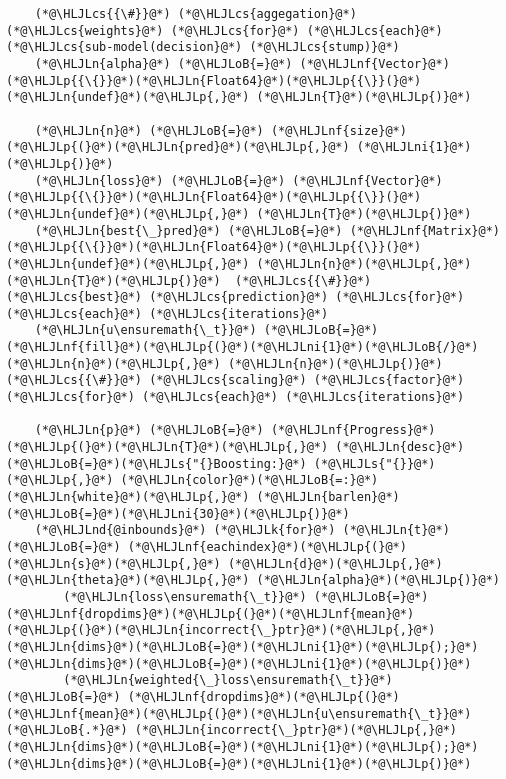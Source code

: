 \documentclass[12pt,a4paper]{article}
\newcommand{\HLJLk}[1]{\textcolor[RGB]{148,91,176}{\textbf{#1}}}
\newcommand{\HLJLn}[1]{#1}
\newcommand{\HLJLnd}[1]{\textcolor[RGB]{214,102,97}{#1}}
\newcommand{\HLJLnf}[1]{\textcolor[RGB]{66,102,213}{#1}}
\newcommand{\HLJLs}[1]{\textcolor[RGB]{201,61,57}{#1}}
\newcommand{\HLJLni}[1]{\textcolor[RGB]{59,151,46}{#1}}
\newcommand{\HLJLoB}[1]{\textcolor[RGB]{102,102,102}{\textbf{#1}}}
\newcommand{\HLJLp}[1]{#1}
\newcommand{\HLJLcs}[1]{\textcolor[RGB]{153,153,119}{\textit{#1}}}
\begin{document}
\begin{lstlisting}
    (*@\HLJLcs{{\#}}@*) (*@\HLJLcs{aggegation}@*) (*@\HLJLcs{weights}@*) (*@\HLJLcs{for}@*) (*@\HLJLcs{each}@*) (*@\HLJLcs{sub-model(decision}@*) (*@\HLJLcs{stump)}@*)
    (*@\HLJLn{alpha}@*) (*@\HLJLoB{=}@*) (*@\HLJLnf{Vector}@*)(*@\HLJLp{{\{}}@*)(*@\HLJLn{Float64}@*)(*@\HLJLp{{\}}(}@*)(*@\HLJLn{undef}@*)(*@\HLJLp{,}@*) (*@\HLJLn{T}@*)(*@\HLJLp{)}@*)

    (*@\HLJLn{n}@*) (*@\HLJLoB{=}@*) (*@\HLJLnf{size}@*)(*@\HLJLp{(}@*)(*@\HLJLn{pred}@*)(*@\HLJLp{,}@*) (*@\HLJLni{1}@*)(*@\HLJLp{)}@*)
    (*@\HLJLn{loss}@*) (*@\HLJLoB{=}@*) (*@\HLJLnf{Vector}@*)(*@\HLJLp{{\{}}@*)(*@\HLJLn{Float64}@*)(*@\HLJLp{{\}}(}@*)(*@\HLJLn{undef}@*)(*@\HLJLp{,}@*) (*@\HLJLn{T}@*)(*@\HLJLp{)}@*)
    (*@\HLJLn{best{\_}pred}@*) (*@\HLJLoB{=}@*) (*@\HLJLnf{Matrix}@*)(*@\HLJLp{{\{}}@*)(*@\HLJLn{Float64}@*)(*@\HLJLp{{\}}(}@*)(*@\HLJLn{undef}@*)(*@\HLJLp{,}@*) (*@\HLJLn{n}@*)(*@\HLJLp{,}@*) (*@\HLJLn{T}@*)(*@\HLJLp{)}@*)  (*@\HLJLcs{{\#}}@*) (*@\HLJLcs{best}@*) (*@\HLJLcs{prediction}@*) (*@\HLJLcs{for}@*) (*@\HLJLcs{each}@*) (*@\HLJLcs{iterations}@*)
    (*@\HLJLn{u\ensuremath{\_t}}@*) (*@\HLJLoB{=}@*) (*@\HLJLnf{fill}@*)(*@\HLJLp{(}@*)(*@\HLJLni{1}@*)(*@\HLJLoB{/}@*)(*@\HLJLn{n}@*)(*@\HLJLp{,}@*) (*@\HLJLn{n}@*)(*@\HLJLp{)}@*)  (*@\HLJLcs{{\#}}@*) (*@\HLJLcs{scaling}@*) (*@\HLJLcs{factor}@*) (*@\HLJLcs{for}@*) (*@\HLJLcs{each}@*) (*@\HLJLcs{iterations}@*)

    (*@\HLJLn{p}@*) (*@\HLJLoB{=}@*) (*@\HLJLnf{Progress}@*)(*@\HLJLp{(}@*)(*@\HLJLn{T}@*)(*@\HLJLp{,}@*) (*@\HLJLn{desc}@*)(*@\HLJLoB{=}@*)(*@\HLJLs{"{}Boosting:}@*) (*@\HLJLs{"{}}@*)(*@\HLJLp{,}@*) (*@\HLJLn{color}@*)(*@\HLJLoB{=:}@*)(*@\HLJLn{white}@*)(*@\HLJLp{,}@*) (*@\HLJLn{barlen}@*)(*@\HLJLoB{=}@*)(*@\HLJLni{30}@*)(*@\HLJLp{)}@*)
    (*@\HLJLnd{@inbounds}@*) (*@\HLJLk{for}@*) (*@\HLJLn{t}@*) (*@\HLJLoB{=}@*) (*@\HLJLnf{eachindex}@*)(*@\HLJLp{(}@*)(*@\HLJLn{s}@*)(*@\HLJLp{,}@*) (*@\HLJLn{d}@*)(*@\HLJLp{,}@*) (*@\HLJLn{theta}@*)(*@\HLJLp{,}@*) (*@\HLJLn{alpha}@*)(*@\HLJLp{)}@*)
        (*@\HLJLn{loss\ensuremath{\_t}}@*) (*@\HLJLoB{=}@*) (*@\HLJLnf{dropdims}@*)(*@\HLJLp{(}@*)(*@\HLJLnf{mean}@*)(*@\HLJLp{(}@*)(*@\HLJLn{incorrect{\_}ptr}@*)(*@\HLJLp{,}@*) (*@\HLJLn{dims}@*)(*@\HLJLoB{=}@*)(*@\HLJLni{1}@*)(*@\HLJLp{);}@*) (*@\HLJLn{dims}@*)(*@\HLJLoB{=}@*)(*@\HLJLni{1}@*)(*@\HLJLp{)}@*)
        (*@\HLJLn{weighted{\_}loss\ensuremath{\_t}}@*) (*@\HLJLoB{=}@*) (*@\HLJLnf{dropdims}@*)(*@\HLJLp{(}@*)(*@\HLJLnf{mean}@*)(*@\HLJLp{(}@*)(*@\HLJLn{u\ensuremath{\_t}}@*)  (*@\HLJLoB{.*}@*) (*@\HLJLn{incorrect{\_}ptr}@*)(*@\HLJLp{,}@*) (*@\HLJLn{dims}@*)(*@\HLJLoB{=}@*)(*@\HLJLni{1}@*)(*@\HLJLp{);}@*) (*@\HLJLn{dims}@*)(*@\HLJLoB{=}@*)(*@\HLJLni{1}@*)(*@\HLJLp{)}@*)
        

\end{lstlisting}
\end{document}
